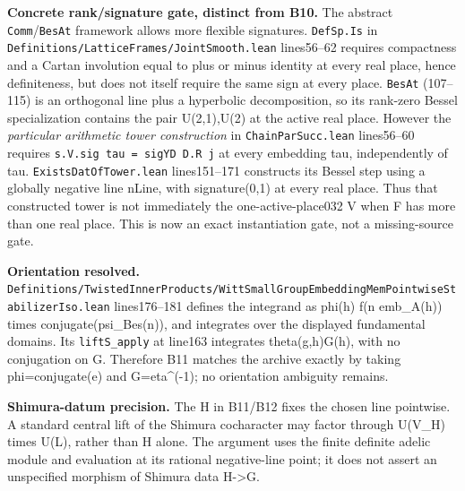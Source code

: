 \textbf{Concrete rank/signature gate, distinct from B10.} The abstract \texttt{Comm}/\texttt{BesAt} framework allows more flexible signatures. \texttt{DefSp.Is} in \texttt{Definitions/LatticeFrames/JointSmooth.lean} lines56--62 requires compactness and a Cartan involution equal to plus or minus identity at every real place, hence definiteness, but does not itself require the same sign at every place. \texttt{BesAt} (107--115) is an orthogonal line plus a hyperbolic decomposition, so its rank-zero Bessel specialization contains the pair U(2,1),U(2) at the active real place. However the \emph{particular arithmetic tower construction} in \texttt{ChainParSucc.lean} lines56--60 requires \texttt{s.V.sig\ tau\ =\ sigYD\ D.R\ j} at every embedding tau, independently of tau. \texttt{ExistsDatOfTower.lean} lines151--171 constructs its Bessel step using a globally negative line nLine, with signature(0,1) at every real place. Thus that constructed tower is not immediately the one-active-place032 V when F has more than one real place. This is now an exact instantiation gate, not a missing-source gate.

\textbf{Orientation resolved.} \texttt{Definitions/TwistedInnerProducts/WittSmallGroupEmbeddingMemPointwiseStabilizerIso.lean} lines176--181 defines the integrand as phi(h) f(n emb\_A(h)) times conjugate(psi\_Bes(n)), and integrates over the displayed fundamental domains. Its \texttt{liftS\_apply} at line163 integrates theta(g,h)G(h), with no conjugation on G. Therefore B11 matches the archive exactly by taking phi=conjugate(e) and G=eta\^{}(-1); no orientation ambiguity remains.

\textbf{Shimura-datum precision.} The H in B11/B12 fixes the chosen line pointwise. A standard central lift of the Shimura cocharacter may factor through U(V\_H) times U(L), rather than H alone. The argument uses the finite definite adelic module and evaluation at its rational negative-line point; it does not assert an unspecified morphism of Shimura data H-\textgreater G.
